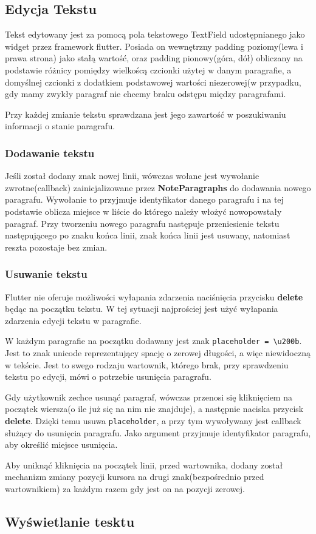 \subsection{Edycja Tekstu}

Tekst edytowany jest za pomocą pola tekstowego TextField udostępnianego jako widget przez framework flutter. Posiada on wewnętrzny padding poziomy(lewa i prawa strona) jako stałą wartość, oraz padding pionowy(góra, dół) obliczany na podstawie różnicy pomiędzy wielkoścą czcionki użytej w danym paragrafie, a domyślnej czcionki z dodatkiem podstawowej wartości niezerowej(w przypadku, gdy mamy zwykły paragraf nie chcemy braku odstępu między paragrafami.

Przy każdej zmianie tekstu sprawdzana jest jego zawartość w poszukiwaniu informacji o stanie paragrafu.

\subsubsection{Dodawanie tekstu}

Jeśli został dodany znak nowej linii, wówczas wołane jest wywołanie zwrotne(callback) zainicjalizowane przez \textbf{NoteParagraphs} do dodawania nowego paragrafu. Wywołanie to przyjmuje identyfikator danego paragrafu i na tej podstawie oblicza miejsce w liście do którego należy włożyć nowopowstały paragraf. Przy tworzeniu nowego paragrafu następuje przeniesienie tekstu następującego po znaku końca linii, znak końca linii jest usuwany, natomiast reszta pozostaje bez zmian.

\subsubsection{Usuwanie tekstu}

Flutter nie oferuje możliwości wyłapania zdarzenia naciśnięcia przycisku \textbf{delete} będąc na początku tekstu. W tej sytuacji najprościej jest użyć wyłapania zdarzenia edycji tekstu w paragrafie.

W każdym paragrafie na początku dodawany jest znak \verb|placeholder = \u200b|. Jest to znak unicode reprezentujący spację o zerowej długości, a więc niewidoczną w tekście. Jest to swego rodzaju wartownik, którego brak, przy sprawdzeniu tekstu po edycji, mówi o potrzebie usunięcia paragrafu.

Gdy użytkownik zechce usunąć paragraf, wówczas przenosi się kliknięciem na początek wiersza(o ile już się na nim nie znajduje), a następnie naciska przycisk \textbf{delete}. Dzięki temu usuwa \verb|placeholder|, a przy tym wywoływany jest callback służący do usunięcia paragrafu. Jako argument przyjmuje identyfikator paragrafu, aby określić miejsce usunięcia.

Aby uniknąć kliknięcia na początek linii, przed wartownika, dodany został mechanizm zmiany pozycji kursora na drugi znak(bezpośrednio przed wartownikiem) za każdym razem gdy jest on na pozycji zerowej.

\subsection{Wyświetlanie tesktu}

